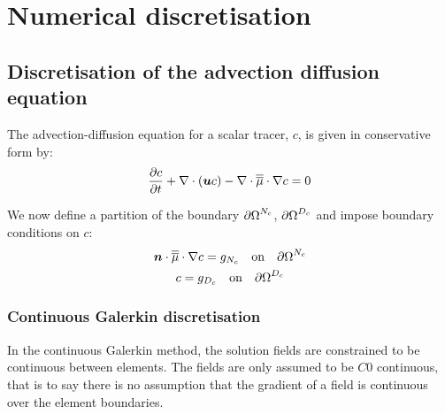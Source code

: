 \chapter{Numerical discretisation}\label{chap:numerical_discretisation}

\section{Discretisation of the advection diffusion equation}
\label{Sect:ND_advection_diffusion_discretisation}

The advection-diffusion equation for a scalar tracer, $c$,
is given in conservative form by:
\begin{equation}\label{eq:advdif}
  \frac{\partial c}{\partial t} + \nabla\cdot\left({\mbox{\boldmath$u$}} c\right) - \nabla\cdot\overline{\overline{\mu}}\cdot\nabla c = 0
\end{equation}

We now define a partition of the boundary ${\partial\Omega}^{N_c}$,
${\partial\Omega}^{D_c}$ and impose boundary conditions on $c$:
\begin{gather}
  \label{eq:cboundary}
  {\mbox{\boldmath$n$}}\cdot\overline{\overline{\mu}}\cdot\nabla c=g_{N_c} \quad\textrm{on}\quad {\partial\Omega}^{N_c}\\
  c=g_{D_c} \quad\textrm{on}\quad {\partial\Omega}^{D_c}
\end{gather}


\subsection{Continuous Galerkin discretisation}

In the continuous Galerkin method, the solution fields are constrained to be
continuous between elements. The fields are only assumed to be $C0$
continuous, that is to say there is no assumption that the gradient of a
field is continuous over the element boundaries.


